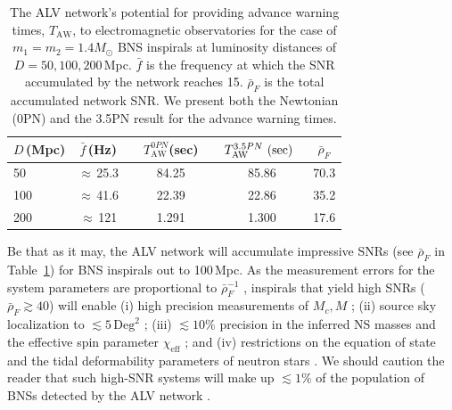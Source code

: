 \documentclass[prd,amsmath,amssymb,aps,floats,amsfonts,notitlepage,superscriptaddress,eqsecnum,nofootinbib,10pt]{revtex4-1}
\newcommand\T{\rule{0pt}{2.6ex}}       %
\newcommand\B{\rule[-1.2ex]{0pt}{0pt}} %
\begin{document}
\begin{table}[h]
\centering
\begin{tabular}{lcccccc}
\hline
$D\,$(Mpc) & $\bar{f}\,$(Hz) &{}& $T^{0PN}_\text{AW}$(sec) &\hspace{1mm} & $T^{3.5PN}_\text{AW}\text{ (sec)}\hspace{2mm}$& $\bar{\rho}_F$\T\B\\
\hline
50 & $\approx\,$25.3 & & 84.25 & & 85.86 & 70.3 \T\\
100 & $\approx\,$41.6 & & 22.39 & & 22.86 & 35.2 \\
200 & $\approx\,$121 & & 1.291 &\quad & 1.300 & 17.6 \\
\hline
\end{tabular}
\caption{The ALV network's potential for providing advance warning times, $T_\text{AW}$, 
to electromagnetic observatories for the case of $m_1=m_2=1.4 M_\odot$ BNS inspirals at luminosity distances of $D=50,100,200\,$Mpc. 
$\bar{f}$ is the frequency at which the  %
SNR accumulated by the network reaches 15. 
$\bar{\rho}_F$ is the total accumulated network SNR. %
We present both the Newtonian (0PN) 
and the 3.5PN result for the advance warning times.}\label{table:LIGO2020}
\end{table}
%
%
Be that as it may,
the ALV network will accumulate impressive SNRs 
(see $\bar{\rho}_F$ in Table~\ref{table:LIGO2020}) for BNS inspirals out to 100\,Mpc.
As the measurement errors for the system parameters are proportional to $\bar\rho^{-1}_F$ \cite{Cutler:1994ys},
inspirals that yield high SNRs ($\bar\rho_F\gtrsim 40$) will enable (i) high precision measurements of 
$M_c, M$ \cite{Farr:2015lna}; (ii) source sky localization to $\lesssim 5\,\text{Deg}^2$ \cite{Rodriguez:2013oaa};
(iii) $ \lesssim 10\%$ precision in the inferred NS masses \cite{Rodriguez:2013oaa} and the effective spin parameter $\chi_\text{eff}$ \cite{Zhu:2017znf}; and
(iv) restrictions on the equation of state and the tidal deformability
parameters of neutron stars \cite{Read:2009yp, Andersson:2009yt, PhysRevD.89.103012, PhysRevD.91.043002}.
We should caution the reader that such high-SNR systems will make up $\lesssim 1\%$ of the population of BNSs detected by 
the ALV network \cite{Sathyaprakash:2012jk}.
\end{document}
